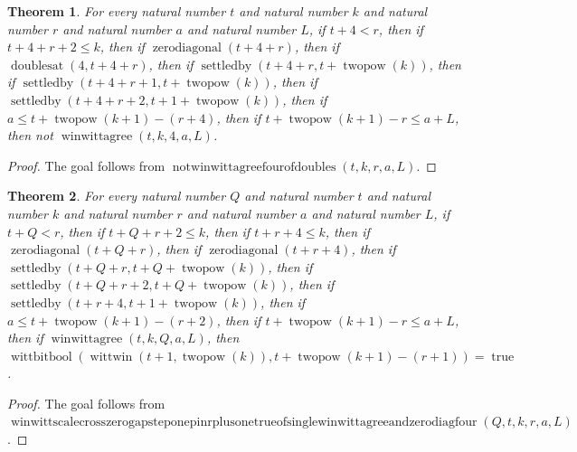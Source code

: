 \documentclass[11pt]{article}
\newtheorem{theorem}{Theorem}[section]
\theoremstyle{definition}
\begin{document}
\begin{theorem}
\label{ll:paper:not-winwittagree-four-of-doubles}
For every natural number \(t\) and natural number \(k\) and natural number \(r\) and natural number \(a\) and natural number \(L\), if \(t + 4 < r\), then if \(t + 4 + r + 2 \le k\), then if \(\operatorname{zerodiagonal}(t + 4 + r)\), then if \(\operatorname{doublesat}(4, t + 4 + r)\), then if \(\operatorname{settledby}(t + 4 + r, t + \operatorname{twopow}(k))\), then if \(\operatorname{settledby}(t + 4 + r + 1, t + \operatorname{twopow}(k))\), then if \(\operatorname{settledby}(t + 4 + r + 2, t + 1 + \operatorname{twopow}(k))\), then if \(a \le t + \operatorname{twopow}(k + 1) - (r + 4)\), then if \(t + \operatorname{twopow}(k + 1) - r \le a + L\), then not \(\operatorname{winwittagree}(t, k, 4, a, L)\).
\end{theorem}
\begin{proof}
The goal follows from \(\operatorname{notwinwittagreefourofdoubles}(t, k, r, a, L)\).
\end{proof}
\begin{theorem}
\label{ll:paper:winwitt-scale-cross-zero-gap-step-one-pin-r-plus-one-true-of-single-winwittagree-and-zero-diag-four}
For every natural number \(Q\) and natural number \(t\) and natural number \(k\) and natural number \(r\) and natural number \(a\) and natural number \(L\), if \(t + Q < r\), then if \(t + Q + r + 2 \le k\), then if \(t + r + 4 \le k\), then if \(\operatorname{zerodiagonal}(t + Q + r)\), then if \(\operatorname{zerodiagonal}(t + r + 4)\), then if \(\operatorname{settledby}(t + Q + r, t + Q + \operatorname{twopow}(k))\), then if \(\operatorname{settledby}(t + Q + r + 2, t + Q + \operatorname{twopow}(k))\), then if \(\operatorname{settledby}(t + r + 4, t + 1 + \operatorname{twopow}(k))\), then if \(a \le t + \operatorname{twopow}(k + 1) - (r + 2)\), then if \(t + \operatorname{twopow}(k + 1) - r \le a + L\), then if \(\operatorname{winwittagree}(t, k, Q, a, L)\), then \(\operatorname{wittbitbool}(\operatorname{wittwin}(t + 1, \operatorname{twopow}(k)), t + \operatorname{twopow}(k + 1) - (r + 1)) = \operatorname{true}\).
\end{theorem}
\begin{proof}
The goal follows from \(\operatorname{winwittscalecrosszerogapsteponepinrplusonetrueofsinglewinwittagreeandzerodiagfour}(Q, t, k, r, a, L)\).
\end{proof}
\end{document}
